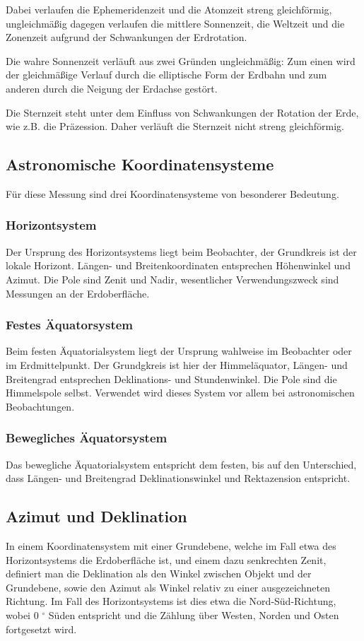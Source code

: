 Dabei verlaufen die Ephemeridenzeit und die Atomzeit streng gleichförmig, ungleichmäßig dagegen verlaufen die mittlere Sonnenzeit, die Weltzeit und die Zonenzeit aufgrund der Schwankungen der Erdrotation.

Die wahre Sonnenzeit verläuft aus zwei Gründen ungleichmäßig: Zum einen wird der gleichmäßige Verlauf durch die elliptische Form der Erdbahn und zum anderen durch die Neigung der Erdachse gestört.

Die Sternzeit steht unter dem Einfluss von Schwankungen der Rotation der Erde, wie z.B. die Präzession. Daher verläuft die Sternzeit nicht streng gleichförmig.

\subsection{Astronomische Koordinatensysteme}
Für diese Messung sind drei Koordinatensysteme von besonderer Bedeutung.

\subsubsection{Horizontsystem}

Der Ursprung des Horizontsystems liegt beim Beobachter, der Grundkreis ist der lokale Horizont. Längen- und Breitenkoordinaten entsprechen Höhenwinkel und Azimut. Die Pole sind Zenit und Nadir, wesentlicher Verwendungszweck sind Messungen an der Erdoberfläche. 

\subsubsection{Festes Äquatorsystem}

Beim festen Äquatorialsystem liegt der Ursprung wahlweise im Beobachter oder im Erdmittelpunkt. Der Grundgkreis ist hier der Himmeläquator, Längen- und Breitengrad entsprechen Deklinations- und Stundenwinkel. Die Pole sind die Himmelspole selbst. Verwendet wird dieses System vor allem bei astronomischen Beobachtungen. 

\subsubsection{Bewegliches Äquatorsystem}

Das bewegliche Äquatorialsystem entspricht dem festen, bis auf den Unterschied, dass Längen- und Breitengrad Deklinationswinkel und Rektazension entspricht. 

\subsection{Azimut und Deklination}
In einem Koordinatensystem mit einer Grundebene, welche im Fall etwa des Horizontsystems die Erdoberfläche ist, und einem dazu senkrechten Zenit, definiert man die Deklination als den Winkel zwischen Objekt und der Grundebene, sowie den Azimut als Winkel relativ zu einer ausgezeichneten Richtung. Im Fall des Horizontsystems ist dies etwa die Nord-Süd-Richtung, wobei 0 $^\circ$ Süden entspricht und die Zählung über Westen, Norden und Osten fortgesetzt wird.  

